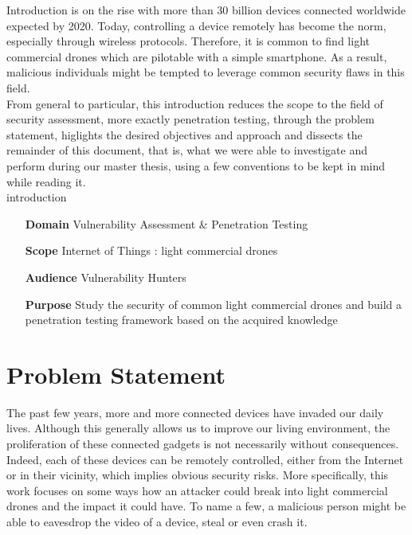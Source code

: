 \begin{chaptercover}{Introduction}%
{
{\large \hyphenation{}  is on the rise with more than 30 billion devices connected worldwide expected by 2020. Today, controlling a device remotely has become the norm, especially through wireless protocols. Therefore, it is common to find light commercial drones which are pilotable with a simple smartphone. As a result, malicious individuals might be tempted to leverage common security flaws in this field. \newline \\ From general to particular, this introduction reduces the scope to the field of security assessment, more exactly penetration testing, through the problem statement, higlights the desired objectives and approach and dissects the remainder of this document, that is, what we were able to investigate and perform during our master thesis, using a few conventions to be kept in mind while reading it.\newline\\}}%
{introduction}

\begin{projectdata}
\begin{itemize}[labelsep=1cm]
  \item [\textbf{Domain}] Vulnerability Assessment \& Penetration Testing
  \item [\textbf{Scope}] Internet of Things : light commercial drones
  \item [\textbf{Audience}] Vulnerability Hunters
  \item [\textbf{Purpose}] Study the security of common light commercial drones and build a penetration testing framework based on the acquired knowledge
\end{itemize}
\end{projectdata}

\section{Problem Statement}
{
The past few years, more and more connected devices have invaded our daily lives. Although this generally allows us to improve our living environment, the proliferation of these connected gadgets is not necessarily without consequences. Indeed, each of these devices can be remotely controlled, either from the Internet or in their vicinity, which implies obvious security risks. More specifically, this work focuses on some ways how an attacker could break into light commercial drones and the impact it could have. To name a few, a malicious person might be able to eavesdrop the video of a device, steal or even crash it.}


\end{chaptercover}
